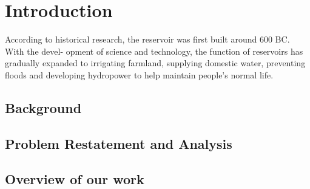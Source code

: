 \section{Introduction}  %

\indent According to historical research, the reservoir was first built around 600 BC. With the devel-
opment of science and technology, the function of reservoirs has gradually expanded to irrigating
farmland, supplying domestic water, preventing floods and developing hydropower to help maintain
people’s normal life.

\subsection{Background}
\subsection{Problem Restatement and Analysis}
\subsection{Overview of our work}
